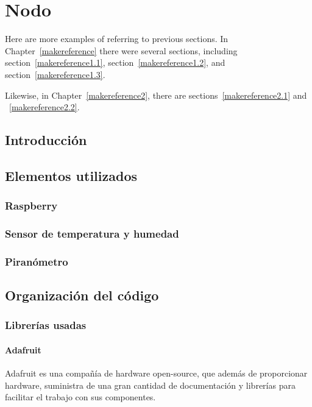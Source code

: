 \cleardoublepage

\chapter{Nodo}
\label{makereference4}

Here are more examples of referring to previous sections.  In
Chapter~\ref{makereference} there were several sections, including
section~\ref{makereference1.1}, section~\ref{makereference1.2},
and section~\ref{makereference1.3}.

Likewise, in Chapter~\ref{makereference2}, there are
sections~\ref{makereference2.1} and ~\ref{makereference2.2}.

\section{Introducción}
\label{makereference4.1}

\section{Elementos utilizados}
\label{makereference4.2}
\subsection{Raspberry}
	\subsection{Sensor de temperatura y humedad}
	\subsection{Piranómetro}

\section{Organización del código}
\label{makereference4.3} 
	\subsection{Librerías usadas}
		\subsubsection{Adafruit}
		Adafruit es una compañía de hardware open-source, que además de proporcionar hardware, suministra de una gran cantidad de documentación y librerías para facilitar el trabajo con sus componentes.
		
